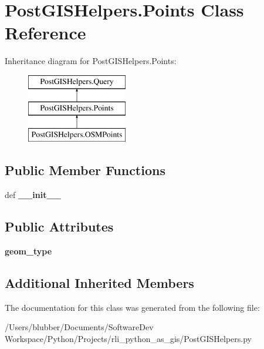 \hypertarget{class_post_g_i_s_helpers_1_1_points}{}\section{Post\+G\+I\+S\+Helpers.\+Points Class Reference}
\label{class_post_g_i_s_helpers_1_1_points}
Inheritance diagram for Post\+G\+I\+S\+Helpers.\+Points\+:\begin{figure}[H]
\begin{center}
\leavevmode
\includegraphics[height=3.000000cm]{class_post_g_i_s_helpers_1_1_points}
\end{center}
\end{figure}
\subsection*{Public Member Functions}
\begin{DoxyCompactItemize}
\item 
\hypertarget{class_post_g_i_s_helpers_1_1_points_ab686c6e368a48a99940b8fd55492e4ea}{}def {\bfseries \+\_\+\+\_\+init\+\_\+\+\_\+}\label{class_post_g_i_s_helpers_1_1_points_ab686c6e368a48a99940b8fd55492e4ea}

\end{DoxyCompactItemize}
\subsection*{Public Attributes}
\begin{DoxyCompactItemize}
\item 
\hypertarget{class_post_g_i_s_helpers_1_1_points_a7682483b6cbcd543c99472de72d07baf}{}{\bfseries geom\+\_\+type}\label{class_post_g_i_s_helpers_1_1_points_a7682483b6cbcd543c99472de72d07baf}

\end{DoxyCompactItemize}
\subsection*{Additional Inherited Members}


The documentation for this class was generated from the following file\+:\begin{DoxyCompactItemize}
\item 
/\+Users/blubber/\+Documents/\+Software\+Dev Workspace/\+Python/\+Projects/rli\+\_\+python\+\_\+as\+\_\+gis/Post\+G\+I\+S\+Helpers.\+py\end{DoxyCompactItemize}
